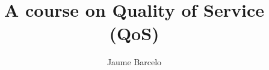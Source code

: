 \documentclass[12pt]{book}
\begin{document}
\frontmatter
\pagestyle{empty}
\title{\textbf{A course on Quality of Service (QoS)}}
\author{Jaume Barcelo}
\maketitle
%
\pagestyle{fancy}
%
\tableofcontents
%
\mainmatter
%



\begin{appendices}
\appendixpage
\noappendicestocpagenum
\addappheadtotoc


\end{appendices}
\backmatter
%


\end{document}
